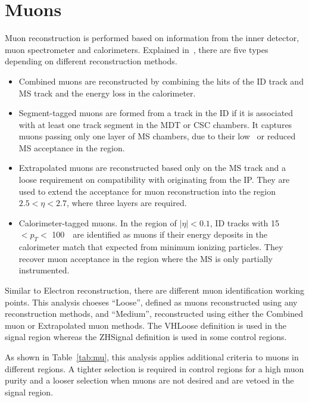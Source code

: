 \section{Muons}
\label{sec:mu}

\par Muon reconstruction is performed based on information from the inner detector, muon spectrometer and calorimeters. Explained in~\cite{Aad:2016jkr}, there are five types depending on different reconstruction methods.

\begin{itemize}
    \item Combined muons are reconstructed by combining the hits of the ID track and MS track and the energy loss in the calorimeter.
    \item Segment-tagged muons are formed from a track in the ID if it is associated with at least one track segment in the MDT or CSC chambers. It captures muons passing only one layer of MS chambers, due to their low \pt~or reduced MS acceptance in the region.
    \item Extrapolated muons are reconstructed based only on the MS track and a loose requirement on compatibility with originating from the IP. They are used to extend the acceptance for muon reconstruction into the region $2.5 <\eta< 2.7$, where three layers are required.
    \item Calorimeter-tagged muons. In the region of $|\eta| < 0.1$, ID tracks with 15~\GeV~$< p_T <$ 100~\GeV~are identified as muons if their energy deposits in the calorimeter match that expected from minimum ionizing particles. They recover muon acceptance in the region where the MS is only partially instrumented.
\end{itemize}

\par Similar to Electron reconstruction, there are different muon identification working points. This analysis choeses ``Loose'', defined as muons reconstructed using any reconstruction methods, and ``Medium'', reconstructed using either the Combined muon or Extrapolated muon methods. The VHLoose definition is used in the signal region whereas the ZHSignal definition is used in some control regions.					
\par As shown in Table~\ref{tab:mu}, this analysis applies additional criteria to muons in different regions. A tighter selection is required in control regions for a high muon purity and a looser selection when muons are not desired and are vetoed in the signal region.

